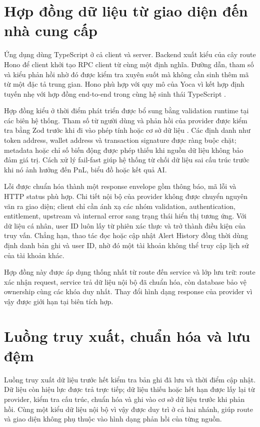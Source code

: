 \section{Hợp đồng dữ liệu từ giao diện đến nhà cung cấp}

Ứng dụng dùng TypeScript ở cả client và server. Backend xuất kiểu của cây route Hono để client khởi tạo RPC client từ cùng một định nghĩa. Đường dẫn, tham số và kiểu phản hồi nhờ đó được kiểm tra xuyên suốt mà không cần sinh thêm mã từ một đặc tả trung gian. Hono phù hợp với quy mô của Yoca vì kết hợp định tuyến nhẹ với hợp đồng end-to-end trong cùng hệ sinh thái TypeScript \cite{hono}.

Hợp đồng kiểu ở thời điểm phát triển được bổ sung bằng validation runtime tại các biên hệ thống. Tham số từ người dùng và phản hồi của provider được kiểm tra bằng Zod trước khi đi vào phép tính hoặc cơ sở dữ liệu \cite{zod}. Các định danh như token address, wallet address và transaction signature được ràng buộc chặt; metadata hoặc chỉ số biến động được phép thiếu khi nguồn dữ liệu không bảo đảm giá trị. Cách xử lý fail-fast giúp hệ thống từ chối dữ liệu sai cấu trúc trước khi nó ảnh hưởng đến PnL, biểu đồ hoặc kết quả AI.

Lỗi được chuẩn hóa thành một response envelope gồm thông báo, mã lỗi và HTTP status phù hợp. Chi tiết nội bộ của provider không được chuyển nguyên văn ra giao diện; client chỉ cần ánh xạ các nhóm validation, authentication, entitlement, upstream và internal error sang trạng thái hiển thị tương ứng. Với dữ liệu cá nhân, user ID luôn lấy từ phiên xác thực và trở thành điều kiện của truy vấn. Chẳng hạn, thao tác đọc hoặc cập nhật Alert History đồng thời dùng định danh bản ghi và user ID, nhờ đó một tài khoản không thể truy cập lịch sử của tài khoản khác.

Hợp đồng này được áp dụng thống nhất từ route đến service và lớp lưu trữ: route xác nhận request, service trả dữ liệu nội bộ đã chuẩn hóa, còn database bảo vệ ownership cùng các khóa duy nhất. Thay đổi hình dạng response của provider vì vậy được giới hạn tại biên tích hợp.

\section{Luồng truy xuất, chuẩn hóa và lưu đệm}

Luồng truy xuất dữ liệu trước hết kiểm tra bản ghi đã lưu và thời điểm cập nhật. Dữ liệu còn hiệu lực được trả trực tiếp; dữ liệu thiếu hoặc hết hạn được lấy lại từ provider, kiểm tra cấu trúc, chuẩn hóa và ghi vào cơ sở dữ liệu trước khi phản hồi. Cùng một kiểu dữ liệu nội bộ vì vậy được duy trì ở cả hai nhánh, giúp route và giao diện không phụ thuộc vào hình dạng phản hồi của từng nguồn.

